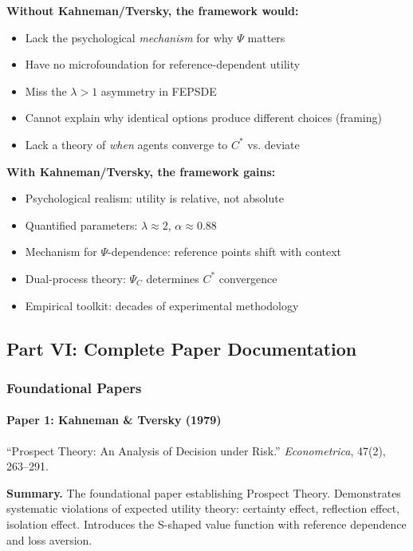 \textbf{Without Kahneman/Tversky, the framework would:}
\begin{itemize}
    \item Lack the psychological \textit{mechanism} for why $\Psi$ matters
    \item Have no microfoundation for reference-dependent utility
    \item Miss the $\lambda > 1$ asymmetry in FEPSDE
    \item Cannot explain why identical options produce different choices (framing)
    \item Lack a theory of \textit{when} agents converge to $C^*$ vs. deviate
\end{itemize}

\textbf{With Kahneman/Tversky, the framework gains:}
\begin{itemize}
    \item Psychological realism: utility is relative, not absolute
    \item Quantified parameters: $\lambda \approx 2$, $\alpha \approx 0.88$
    \item Mechanism for $\Psi$-dependence: reference points shift with context
    \item Dual-process theory: $\Psi_C$ determines $C^*$ convergence
    \item Empirical toolkit: decades of experimental methodology
\end{itemize}

\subsection{Part VI: Complete Paper Documentation}

\subsubsection{Foundational Papers}

\paragraph{Paper 1: Kahneman \& Tversky (1979)}

``Prospect Theory: An Analysis of Decision under Risk.''
\textit{Econometrica}, 47(2), 263--291.

\textbf{Summary.}
The foundational paper establishing Prospect Theory. Demonstrates systematic 
violations of expected utility theory: certainty effect, reflection effect, 
isolation effect. Introduces the S-shaped value function with reference dependence 
and loss aversion.

